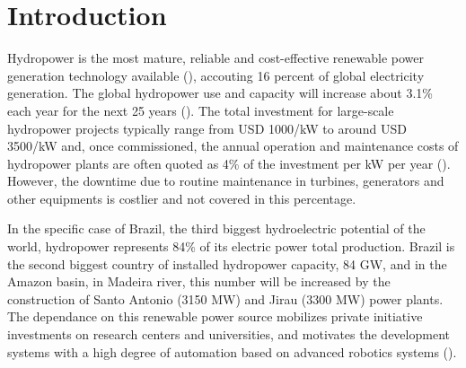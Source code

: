 \section{Introduction}
Hydropower is the most mature, reliable and cost-effective
renewable power generation technology available (\cite{brown}), accouting 16
percent of global electricity generation. The global hydropower use and
capacity will increase about 3.1\% each year for the next 25 years (\cite{wi}).
The total investment for large-scale hydropower projects
typically range from USD 1000/kW to around USD 3500/kW and, once commissioned,
the annual operation and maintenance costs of hydropower plants are often
quoted as 4\% of the investment per kW per year (\cite{ecofys}). However, the
downtime due to routine maintenance in turbines, generators and other
equipments is costlier and not covered in this percentage.

 
In the specific case of Brazil, the third biggest hydroelectric potential of
the world, hydropower represents 84\% of its electric power total production.
Brazil is the second biggest country of installed hydropower capacity, 84 GW,
and in the Amazon basin, in Madeira river, this number will be increased by
the construction of Santo Antonio (3150 MW) and Jirau (3300 MW) power plants.
The dependance on this renewable power source mobilizes private initiative
investments on research centers and universities, and motivates the development
systems with a high degree of automation based on advanced robotics systems
(\cite{aneel}). 



